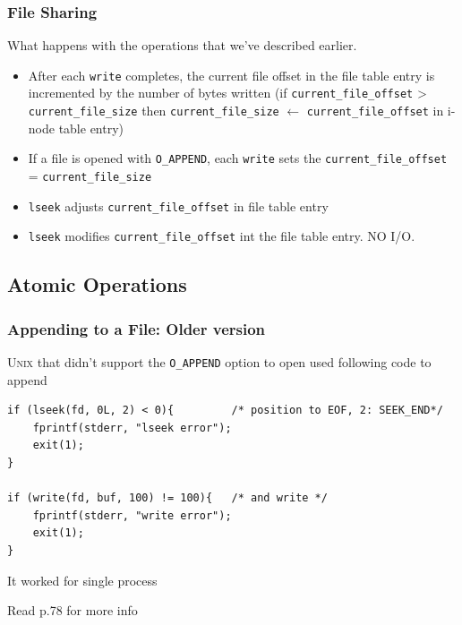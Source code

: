 \documentclass[newPxFont,sthlmFooter,nooffset]{beamer}
\begin{document}
\begin{frame}[t]
  \frametitle{File Sharing}
What happens with the operations that we've described earlier.
\begin{itemize}
\item After each \texttt{write} completes, the current file offset in the file table entry is incremented by the number of bytes written (if \texttt{current\_file\_offset} > \texttt{current\_file\_size} then \texttt{current\_file\_size} $\leftarrow$ \texttt{current\_file\_offset} in i-node table entry)
\item If a file is opened with \texttt{O\_APPEND}, each \texttt{write} sets the \texttt{current\_file\_offset} = \texttt{current\_file\_size}
\item \texttt{lseek} adjusts \texttt{current\_file\_offset} in file table entry
\item \texttt{lseek} modifies \texttt{current\_file\_offset} int the file table entry. NO I/O.
\end{itemize}
\end{frame}

\subsection{Atomic Operations}

\begin{frame}[containsverbatim,t]
  \frametitle{Appending to a  File: Older version}

\textsc{Unix} that didn't support the \texttt{O\_APPEND} option to open used following code to append

\begin{lstlisting}
if (lseek(fd, 0L, 2) < 0){         /* position to EOF, 2: SEEK_END*/
    fprintf(stderr, "lseek error");
    exit(1);
}

if (write(fd, buf, 100) != 100){   /* and write */
    fprintf(stderr, "write error");
    exit(1);
}

\end{lstlisting}
\bigskip
It worked for single process

\bigskip
Read p.78 for more info
\end{frame}
\end{document}
